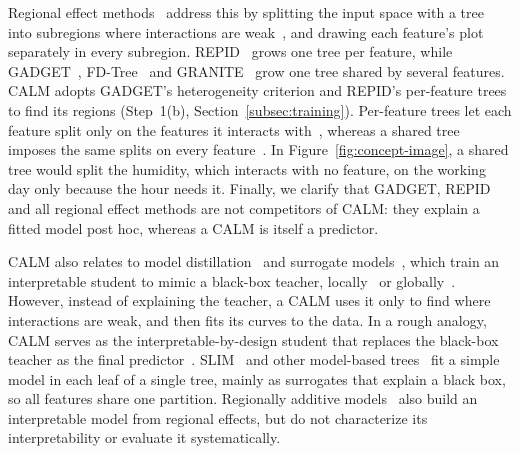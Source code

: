 Regional effect methods~\cite{gkolemis2024fast} address this by splitting the input space with a tree into subregions where interactions are weak~\cite{scholbeck2024marginal}, and drawing each feature's plot separately in every subregion.
REPID~\cite{herbinger2022REPID} grows one tree per feature, while GADGET~\cite{herbinger2024GADGET}, FD-Tree~\cite{laberge2024fdtree} and GRANITE~\cite{herbinger2026granite} grow one tree shared by several features.
CALM adopts GADGET's heterogeneity criterion and REPID's per-feature trees to find its regions (Step~1(b), Section~\ref{subsec:training}).
Per-feature trees let each feature split only on the features it interacts with~\cite{berger2019tree, burgin2017coefficient}, whereas a shared tree imposes the same splits on every feature~\cite{zeileis2008model}.
In Figure~\ref{fig:concept-image}, a shared tree would split the humidity, which interacts with no feature, on the working day only because the hour needs it.
Finally, we clarify that GADGET, REPID and all regional effect methods are not competitors of CALM: they explain a fitted model post hoc, whereas a CALM is itself a predictor.

CALM also relates to model distillation~\cite{hinton2015distilling, tan2018distill} and surrogate models~\cite{guidotti2018survey}, which train an interpretable student to mimic a black-box teacher, locally~\cite{ribeiro2016should} or globally~\cite{frosst2017distillingneuralnetworksoft, guidotti2018survey}.
However, instead of explaining the teacher, a CALM uses it only to find where interactions are weak, and then fits its curves to the data.
In a rough analogy, CALM serves as the interpretable-by-design student that replaces the black-box teacher as the final predictor~\cite{henckaerts2022when, gosiewska2021simpler}.
SLIM~\cite{hu2020surrogate} and other model-based trees~\cite{herbinger2023leveraging} fit a simple model in each leaf of a single tree, mainly as surrogates that explain a black box, so all features share one partition.
Regionally additive models~\cite{gkolemis2023regionally} also build an interpretable model from regional effects, but do not characterize its interpretability or evaluate it systematically.
